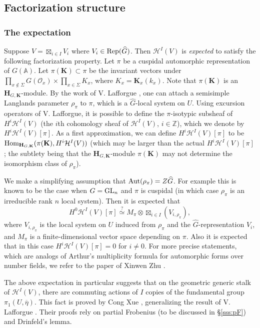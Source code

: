 \documentclass[11pt]{amsart}
\numberwithin{equation}{section}
\theoremstyle{plain}
\theoremstyle{definition}
\def\AA{\mathbb{A}}
\def\ZZ{\mathbb{Z}}
\newcommand\cH{\mathcal{H}}
\newcommand\cO{\mathcal{O}}
\def\bH{\mathbf{H}}
\def\bK{\mathbf{K}}
\def\dG{\widehat{G}}
\newcommand\Rep{\textup{Rep}}
\newcommand\Aut{\textup{Aut}}
\newcommand\Hom{\textup{Hom}}
\newcommand\GL{\textup{GL}}
\newcommand{\ov}{\overline}
\newcommand\sss{\subsubsection}
\newcommand\ot{\otimes}
\renewcommand\r\rho
\newcommand{\Sig}{\Sigma}
\newcommand{\y}{\eta}
\begin{document}
\subsection{Factorization structure}

\sss{The expectation}
Suppose $V=\boxtimes_{i\in I}V_{i}$ where $V_{i}\in \Rep(\dG)$. Then $\cH^{I}(V)$ is {\em expected} to satisfy the following factorization property.  Let $\pi$ be a cuspidal automorphic representation of $G(\AA)$. Let $\pi(\bK)\subset \pi$ be the invariant vectors under $\prod_{x\notin\Sig}G(\cO_{x})\times \prod_{x\in \Sig}K_{x}$, where $K_{x}=\bK_{x}(k_{x})$. Note that $\pi(\bK)$ is an $\bH_{G,\bK}$-module. By the work of V. Lafforgue \cite{VLaff}, one can attach a semisimple Langlands parameter $\r_{\pi}$ to $\pi$, which is a $\dG$-local system on $U$. Using excursion operators of V. Lafforgue,  it is possible to define the $\pi$-isotypic subsheaf of $H^{i}\cH^{I}(V)$ (the $i$th cohomology sheaf of $\cH^{I}(V)$, $i\in \ZZ$), which we denote by $H^{i}\cH^{I}(V)[\pi]$. As a first approximation, we can define $H^{i}\cH^{I}(V)[\pi]$ to be $\Hom_{\bH_{G,\bK}}(\pi(\bK), H^{i}\cH^{I}(V))$ (which may be larger than the actual $H^{i}\cH^{I}(V)[\pi]$; the subtlety being  that the $\bH_{G,\bK}$-module $\pi(\bK)$ may not determine the isomorphism class of $\r_{\pi}$).

We make a simplifying assumption that $\Aut(\r_{\pi})=Z\dG$. For example this is known to be the case when $G=\GL_{n}$ and $\pi$ is cuspidal (in which case $\r_{\pi}$ is an irreducible rank $n$ local system). Then it is expected that 
\begin{equation*}
H^{0}\cH^{I}(V)[\pi]\stackrel{?}{\simeq} M_{\pi}\ot \boxtimes_{i\in I}(V_{i,\r_{\pi}}),
\end{equation*}
where $V_{i,\r_{\pi}}$ is the local system on $U$ induced from $\r_{\pi}$ and the $\dG$-representation $V_{i}$, and $M_{\pi}$ is a finite-dimensional vector space depending on $\pi$. Also it is expected that in this case $H^{i}\cH^{I}(V)[\pi]=0$  for $i\ne0$. For more precise statements, which are analogs of Arthur's multiplicity formula for automorphic forms over number fields, we refer to the paper of Xinwen Zhu \cite[\S4.7]{Zhu}.

The above expectation in particular suggests that on the geometric generic stalk of $\cH^{I}(V)$, there are commuting actions of $I$ copies of the fundamental group $\pi_{1}(U,\ov \y)$.  This fact is proved by Cong Xue \cite{X}, generalizing the result of V. Lafforgue \cite{VLaff}.  Their proofs rely on partial Frobenius (to be discussed in \S\ref{sss:pF}) and Drinfeld's lemma. 
\end{document}
